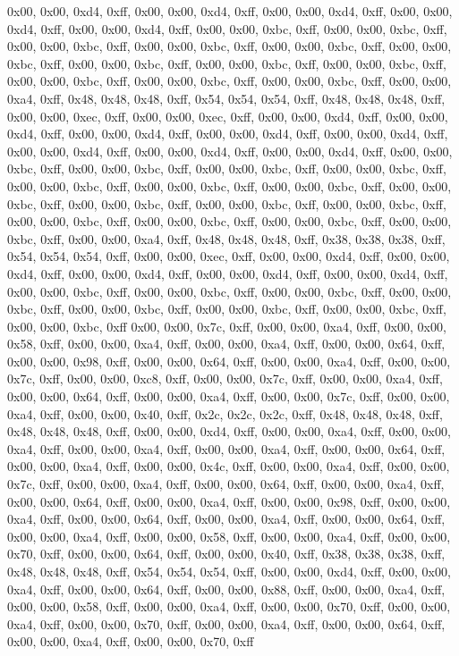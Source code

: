 0x00, 0x00, 0xd4, 0xff, 0x00, 0x00, 0xd4, 0xff, 0x00, 0x00, 0xd4, 0xff, 0x00, 0x00, 0xd4, 0xff, 0x00, 0x00, 0xd4, 0xff, 0x00, 0x00, 0xbc, 0xff, 0x00, 0x00, 0xbc, 0xff, 0x00, 0x00, 0xbc, 0xff, 0x00, 0x00, 0xbc, 0xff, 0x00, 0x00, 0xbc, 0xff, 0x00, 0x00, 0xbc, 0xff, 0x00, 0x00, 0xbc, 0xff, 0x00, 0x00, 0xbc, 0xff, 0x00, 0x00, 0xbc, 0xff, 0x00, 0x00, 0xbc, 0xff, 0x00, 0x00, 0xbc, 0xff, 0x00, 0x00, 0xbc, 0xff, 0x00, 0x00, 0xa4, 0xff, 0x48, 0x48, 0x48, 0xff, 0x54, 0x54, 0x54, 0xff, 0x48, 0x48, 0x48, 0xff, 0x00, 0x00, 0xec, 0xff, 0x00, 0x00, 0xec, 0xff, 0x00, 0x00, 0xd4, 0xff, 0x00, 0x00, 0xd4, 0xff, 0x00, 0x00, 0xd4, 0xff, 0x00, 0x00, 0xd4, 0xff, 0x00, 0x00, 0xd4, 0xff, 0x00, 0x00, 0xd4, 0xff, 0x00, 0x00, 0xd4, 0xff, 0x00, 0x00, 0xd4, 0xff, 0x00, 0x00, 0xbc, 0xff, 0x00, 0x00, 0xbc, 0xff, 0x00, 0x00, 0xbc, 0xff, 0x00, 0x00, 0xbc, 0xff, 0x00, 0x00, 0xbc, 0xff, 0x00, 0x00, 0xbc, 0xff, 0x00, 0x00, 0xbc, 0xff, 0x00, 0x00, 0xbc, 0xff, 0x00, 0x00, 0xbc, 0xff, 0x00, 0x00, 0xbc, 0xff, 0x00, 0x00, 0xbc, 0xff, 0x00, 0x00, 0xbc, 0xff, 0x00, 0x00, 0xbc, 0xff, 0x00, 0x00, 0xbc, 0xff, 0x00, 0x00, 0xbc, 0xff, 0x00, 0x00, 0xa4, 0xff, 0x48, 0x48, 0x48, 0xff, 0x38, 0x38, 0x38, 0xff, 0x54, 0x54, 0x54, 0xff, 0x00, 0x00, 0xec, 0xff, 0x00, 0x00, 0xd4, 0xff, 0x00, 0x00, 0xd4, 0xff, 0x00, 0x00, 0xd4, 0xff, 0x00, 0x00, 0xd4, 0xff, 0x00, 0x00, 0xd4, 0xff, 0x00, 0x00, 0xbc, 0xff, 0x00, 0x00, 0xbc, 0xff, 0x00, 0x00, 0xbc, 0xff, 0x00, 0x00, 0xbc, 0xff, 0x00, 0x00, 0xbc, 0xff, 0x00, 0x00, 0xbc, 0xff, 0x00, 0x00, 0xbc, 0xff, 0x00, 0x00, 0xbc, 0xff
0x00, 0x00, 0x7c, 0xff, 0x00, 0x00, 0xa4, 0xff, 0x00, 0x00, 0x58, 0xff, 0x00, 0x00, 0xa4, 0xff, 0x00, 0x00, 0xa4, 0xff, 0x00, 0x00, 0x64, 0xff, 0x00, 0x00, 0x98, 0xff, 0x00, 0x00, 0x64, 0xff, 0x00, 0x00, 0xa4, 0xff, 0x00, 0x00, 0x7c, 0xff, 0x00, 0x00, 0xc8, 0xff, 0x00, 0x00, 0x7c, 0xff, 0x00, 0x00, 0xa4, 0xff, 0x00, 0x00, 0x64, 0xff, 0x00, 0x00, 0xa4, 0xff, 0x00, 0x00, 0x7c, 0xff, 0x00, 0x00, 0xa4, 0xff, 0x00, 0x00, 0x40, 0xff, 0x2c, 0x2c, 0x2c, 0xff, 0x48, 0x48, 0x48, 0xff, 0x48, 0x48, 0x48, 0xff, 0x00, 0x00, 0xd4, 0xff, 0x00, 0x00, 0xa4, 0xff, 0x00, 0x00, 0xa4, 0xff, 0x00, 0x00, 0xa4, 0xff, 0x00, 0x00, 0xa4, 0xff, 0x00, 0x00, 0x64, 0xff, 0x00, 0x00, 0xa4, 0xff, 0x00, 0x00, 0x4c, 0xff, 0x00, 0x00, 0xa4, 0xff, 0x00, 0x00, 0x7c, 0xff, 0x00, 0x00, 0xa4, 0xff, 0x00, 0x00, 0x64, 0xff, 0x00, 0x00, 0xa4, 0xff, 0x00, 0x00, 0x64, 0xff, 0x00, 0x00, 0xa4, 0xff, 0x00, 0x00, 0x98, 0xff, 0x00, 0x00, 0xa4, 0xff, 0x00, 0x00, 0x64, 0xff, 0x00, 0x00, 0xa4, 0xff, 0x00, 0x00, 0x64, 0xff, 0x00, 0x00, 0xa4, 0xff, 0x00, 0x00, 0x58, 0xff, 0x00, 0x00, 0xa4, 0xff, 0x00, 0x00, 0x70, 0xff, 0x00, 0x00, 0x64, 0xff, 0x00, 0x00, 0x40, 0xff, 0x38, 0x38, 0x38, 0xff, 0x48, 0x48, 0x48, 0xff, 0x54, 0x54, 0x54, 0xff, 0x00, 0x00, 0xd4, 0xff, 0x00, 0x00, 0xa4, 0xff, 0x00, 0x00, 0x64, 0xff, 0x00, 0x00, 0x88, 0xff, 0x00, 0x00, 0xa4, 0xff, 0x00, 0x00, 0x58, 0xff, 0x00, 0x00, 0xa4, 0xff, 0x00, 0x00, 0x70, 0xff, 0x00, 0x00, 0xa4, 0xff, 0x00, 0x00, 0x70, 0xff, 0x00, 0x00, 0xa4, 0xff, 0x00, 0x00, 0x64, 0xff, 0x00, 0x00, 0xa4, 0xff, 0x00, 0x00, 0x70, 0xff
